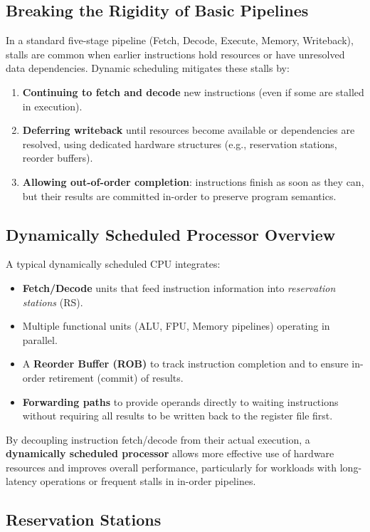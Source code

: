 \subsection{Breaking the Rigidity of Basic Pipelines}
In a standard five-stage pipeline (Fetch, Decode, Execute, Memory, Writeback),
stalls are common when earlier instructions hold resources or have unresolved
data dependencies. Dynamic scheduling mitigates these stalls by:
\begin{enumerate}
  \item \textbf{Continuing to fetch and decode} new instructions (even if some are
        stalled in execution).
  \item \textbf{Deferring writeback} until resources become available or dependencies
        are resolved, using dedicated hardware structures (e.g., reservation
        stations, reorder buffers).
  \item \textbf{Allowing out-of-order completion}: instructions finish as soon as they
        can, but their results are committed in-order to preserve program semantics.
\end{enumerate}

\subsection{Dynamically Scheduled Processor Overview}
A typical dynamically scheduled CPU integrates:
\begin{itemize}
  \item \textbf{Fetch/Decode} units that feed instruction information into
        \emph{reservation stations} (RS).
  \item Multiple functional units (ALU, FPU, Memory pipelines) operating in
        parallel.
  \item A \textbf{Reorder Buffer (ROB)} to track instruction completion and to
        ensure in-order retirement (commit) of results.
  \item \textbf{Forwarding paths} to provide operands directly to waiting instructions
        without requiring all results to be written back to the register file first.
\end{itemize}

By decoupling instruction fetch/decode from their actual execution, a
\textbf{dynamically scheduled processor} allows more effective use of hardware
resources and improves overall performance, particularly for workloads with
long-latency operations or frequent stalls in in-order pipelines.
\subsection{Reservation Stations}

